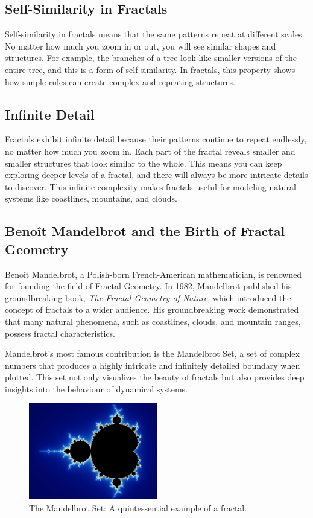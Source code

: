 \documentclass[12pt]{article}
\begin{document}
\subsection{Self-Similarity in Fractals}
Self-similarity in fractals means that the same patterns repeat at different scales. No matter how much you zoom in or out, you will see similar shapes and structures. For example, the branches of a tree look like smaller versions of the entire tree, and this is a form of self-similarity. In fractals, this property shows how simple rules can create complex and repeating structures.

\subsection{Infinite Detail}
Fractals exhibit infinite detail because their patterns continue to repeat endlessly, no matter how much you zoom in. Each part of the fractal reveals smaller and smaller structures that look similar to the whole. This means you can keep exploring deeper levels of a fractal, and there will always be more intricate details to discover. This infinite complexity makes fractals useful for modeling natural systems like coastlines, mountains, and clouds.

\subsection{Benoît Mandelbrot and the Birth of Fractal Geometry}
Benoît Mandelbrot, a Polish-born French-American mathematician, is renowned for founding the field of Fractal Geometry. In 1982, Mandelbrot published his groundbreaking book, \emph{The Fractal Geometry of Nature}, which introduced the concept of fractals to a wider audience. His groundbreaking work demonstrated that many natural phenomena, such as coastlines, clouds, and mountain ranges, possess fractal characteristics. 

Mandelbrot's most famous contribution is the Mandelbrot Set, a set of complex numbers that produces a highly intricate and infinitely detailed boundary when plotted. This set not only visualizes the beauty of fractals but also provides deep insights into the behaviour of dynamical systems.

\begin{figure}[H]
\centering
\includegraphics[width=0.5\textwidth]{assets/mandelbrot-set.jpg}
\caption{The Mandelbrot Set: A quintessential example of a fractal.}
\label{fig:mandelbrot}
\end{figure}
\end{document}
